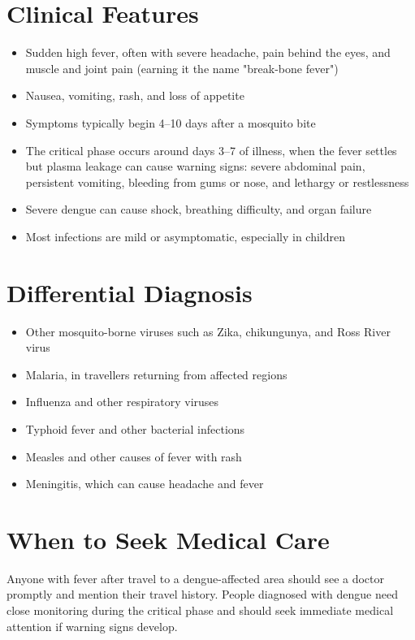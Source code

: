\section*{Clinical Features}
\begin{itemize}
    \item Sudden high fever, often with severe headache, pain behind the eyes, and muscle and joint pain (earning it the name "break-bone fever")
    \item Nausea, vomiting, rash, and loss of appetite
    \item Symptoms typically begin 4--10 days after a mosquito bite
    \item The critical phase occurs around days 3--7 of illness, when the fever settles but plasma leakage can cause warning signs: severe abdominal pain, persistent vomiting, bleeding from gums or nose, and lethargy or restlessness
    \item Severe dengue can cause shock, breathing difficulty, and organ failure
    \item Most infections are mild or asymptomatic, especially in children
\end{itemize}

\section*{Differential Diagnosis}
\begin{itemize}
    \item Other mosquito-borne viruses such as Zika, chikungunya, and Ross River virus
    \item Malaria, in travellers returning from affected regions
    \item Influenza and other respiratory viruses
    \item Typhoid fever and other bacterial infections
    \item Measles and other causes of fever with rash
    \item Meningitis, which can cause headache and fever
\end{itemize}

\section*{When to Seek Medical Care}
Anyone with fever after travel to a dengue-affected area should see a doctor promptly and mention their travel history. People diagnosed with dengue need close monitoring during the critical phase and should seek immediate medical attention if warning signs develop.

